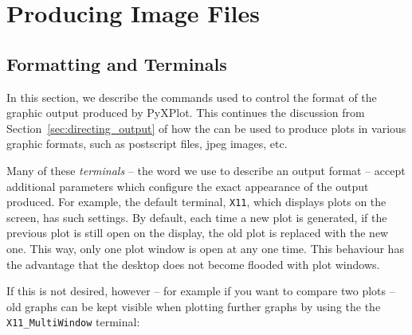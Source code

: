 %
%
%
%
%



\chapter{Producing Image Files}

\section{Formatting and Terminals}
\label{sec:set_terminal}

In this section, we describe the commands used to control the format of the
graphic output produced by PyXPlot. This continues the discussion from
Section~\ref{sec:directing_output} of how the  can be
used to produce plots in various graphic formats, such as postscript files,
jpeg images, etc.

Many of these {\it terminals} -- the word we use to describe an output format
-- accept additional parameters which configure the exact appearance of the
output produced.  For example, the default terminal, {\tt X11}, which displays
plots on the screen, has such settings. By default, each time a new plot is
generated, if the previous plot is still open on the display, the old plot is
replaced with the new one. This way, only one plot window is open at any one
time.  This behaviour has the advantage that the desktop does not become
flooded with plot windows.

If this is not desired, however -- for example if you want to compare two plots
-- old graphs can be kept visible when plotting further graphs by using the the
{\tt X11\_MultiWindow} terminal:


